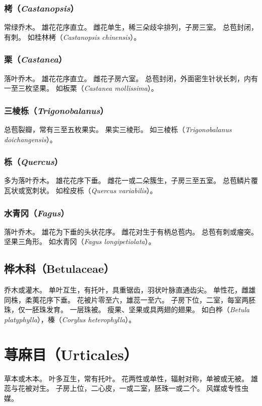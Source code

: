 \documentclass[11pt]{article}
\begin{document}
\begin{sloppypar}
\subsubsection{栲（\textit{Castanopsis}）}
常绿乔木。
雄花花序直立。
雌花单生，稀三朵歧伞排列，子房三室。
总苞封闭，有刺。
如桂林栲（\textit{Castanopsis chinensis}）。

\subsubsection{栗（\textit{Castanea}）}
落叶乔木。
雄花花序直立。
雌花子房六室。
总苞封闭，外面密生针状长刺，内有一至三枚坚果。
如板栗（\textit{Castanea mollissima}）。

\subsubsection{三棱栎（\textit{Trigonobalanus}）}
总苞裂瓣，常有三至五枚果实。
果实三棱形。
如三棱栎（\textit{Trigonobalanus doichangensis}）。

\subsubsection{栎（\textit{Quercus}）}
多为落叶乔木。
雄花花序下垂。
雌花一或二朵簇生，子房三至五室。
总苞鳞片覆瓦状或宽刺状。
如栓皮栎（\textit{Quercus variabilis}）。

\subsubsection{水青冈（\textit{Fagus}）}
落叶乔木。
雄花为下垂的头状花序。
雌花对生于有柄总苞内。
总苞有刺或瘤突。
坚果三角形。
如水青冈（\textit{Fagus longipetiolata}）。

\subsection{桦木科（Betulaceae）}
乔木或灌木。
单叶互生，有托叶，具重锯齿，羽状叶脉直通齿尖。
单性花，雌雄同株，柔荑花序下垂。
花被片零至六，雄蕊一至六。
子房下位，二室，每室两胚珠，仅一胚珠发育。
一层珠被。
瘦果、坚果或具两翅的翅果。
如白桦（\textit{Betula platyphylla}），榛（\textit{Corylus heterophylla}）。

\section{荨麻目（Urticales）}
草本或木本。
叶多互生，常有托叶。
花两性或单性，辐射对称，单被或无被。
雄蕊与花被对生。
子房上位，二心皮，一或二室，胚珠一或二个。
风媒或专性虫媒。


\end{sloppypar}
\end{document}
